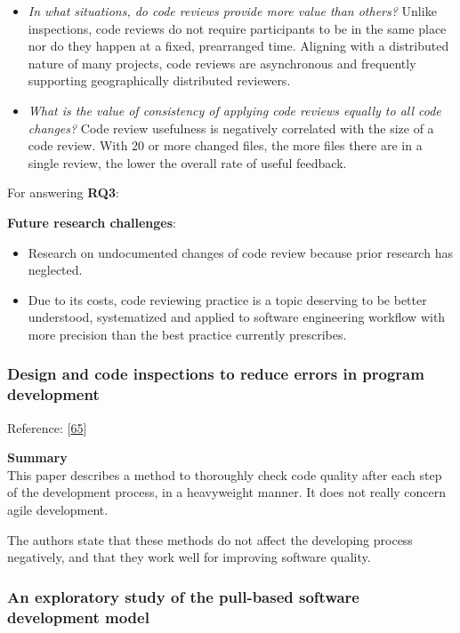 \documentclass[]{book}
\providecommand{\tightlist}{%
  \setlength{\itemsep}{0pt}\setlength{\parskip}{0pt}}
\begin{document}
\begin{itemize}
\tightlist
\item
  \emph{In what situations, do code reviews provide more value than
  others?} Unlike inspections, code reviews do not require participants
  to be in the same place nor do they happen at a fixed, prearranged
  time. Aligning with a distributed nature of many projects, code
  reviews are asynchronous and frequently supporting geographically
  distributed reviewers.
\item
  \emph{What is the value of consistency of applying code reviews
  equally to all code changes?} Code review usefulness is negatively
  correlated with the size of a code review. With 20 or more changed
  files, the more files there are in a single review, the lower the
  overall rate of useful feedback.
\end{itemize}

For answering \textbf{RQ3}:

\textbf{Future research challenges}:

\begin{itemize}
\item
  Research on undocumented changes of code review because prior research
  has neglected.
\item
  Due to its costs, code reviewing practice is a topic deserving to be
  better understood, systematized and applied to software engineering
  workflow with more precision than the best practice currently
  prescribes.
\end{itemize}

\subsubsection{Design and code inspections to reduce errors in program
development}\label{design-and-code-inspections-to-reduce-errors-in-program-development}

Reference: {[}\protect\hyperlink{ref-fagan2002design}{65}{]}

\textbf{Summary}\\
This paper describes a method to thoroughly check code quality after
each step of the development process, in a heavyweight manner. It does
not really concern agile development.

The authors state that these methods do not affect the developing
process negatively, and that they work well for improving software
quality.

\subsubsection{An exploratory study of the pull-based software
development
model}\label{an-exploratory-study-of-the-pull-based-software-development-model}
\end{document}
